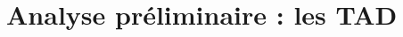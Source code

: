 \documentclass[10pt]{article}
\begin{document}
    \section{Analyse préliminaire : les TAD}
        
        
        
        
        
\end{document}
